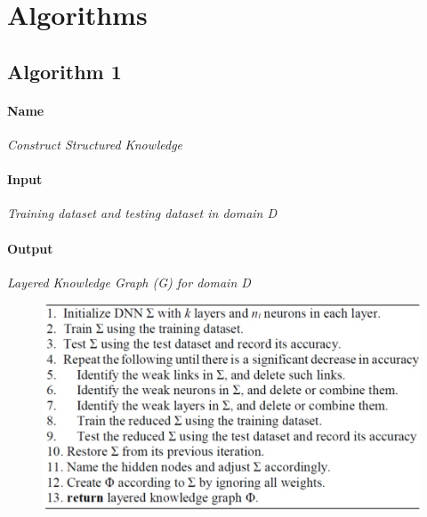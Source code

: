 \documentclass[11pt,fleqn]{book} %
\begin{document}

\newpage
{}
\chapter{Algorithms}

\section{Algorithm 1}
\subsubsection{Name}
\emph{\color{ocre}Construct Structured Knowledge}
\subsubsection{Input}
\emph{Training dataset and testing dataset in domain D}
\subsubsection{Output}
\emph{Layered Knowledge Graph (G) for domain D}
\begin{figure}[ht]
    \centering
    \includegraphics[scale=0.8]{Pictures/algo1.jpg}
\end{figure}
\end{document}
